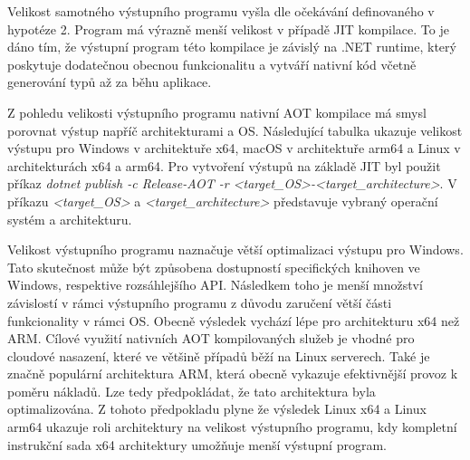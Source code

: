 Velikost samotného výstupního programu vyšla dle očekávání definovaného v hypotéze 2. Program má výrazně menší velikost v případě JIT kompilace. To je dáno tím, že výstupní program této kompilace je závislý na .NET runtime, který poskytuje dodatečnou obecnou funkcionalitu a vytváří nativní kód včetně generování typů až za běhu aplikace.

Z pohledu velikosti výstupního programu nativní AOT kompilace má smysl porovnat výstup napříč architekturami a OS. Následující tabulka ukazuje velikost výstupu pro Windows v architektuře x64, macOS v architektuře arm64 a Linux v architekturách x64 a arm64. Pro vytvoření výstupů na základě JIT byl použit příkaz \emph{dotnet publish -c Release-AOT -r <target\_OS>-<target\_architecture>}. V příkazu \emph{<target\_OS>} a \emph{<target\_architecture>} představuje vybraný operační systém a architekturu.


Velikost výstupního programu naznačuje větší optimalizaci výstupu pro Windows. Tato skutečnost může být způsobena dostupností specifických knihoven ve Windows, respektive rozsáhlejšího API. Následkem toho je menší množství závislostí v rámci výstupního programu z důvodu zaručení větší části funkcionality v rámci OS. Obecně výsledek vychází lépe pro architekturu x64 než ARM. Cílové využití nativních AOT kompilovaných služeb je vhodné pro cloudové nasazení, které ve většině případů běží na Linux serverech. Také je značně populární architektura ARM, která obecně vykazuje efektivnější provoz k poměru nákladů. Lze tedy předpokládat, že tato architektura byla optimalizována. Z tohoto předpokladu plyne že výsledek Linux x64 a Linux arm64 ukazuje roli architektury na velikost výstupního programu, kdy kompletní instrukční sada x64 architektury umožňuje menší výstupní program.

